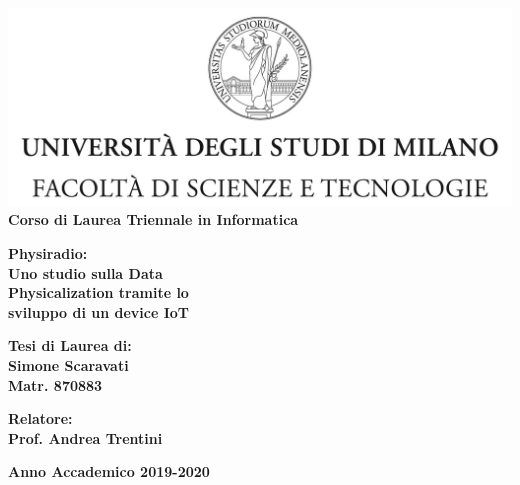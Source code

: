 \documentclass[12pt,a4paper]{report}
\begin{document}
\begin{titlepage}
\begin{center}
\includegraphics[width=\textwidth]{Immagini/Logo.jpg}\\
{\large{\bf Corso di Laurea Triennale in Informatica}}
\end{center}
\vspace{12mm}
\begin{center}
{\huge{\bf Physiradio:}}\\
\vspace{4mm}
{\huge{\bf Uno studio sulla Data}}\\
\vspace{4mm}
{\huge{\bf Physicalization tramite lo}}\\
\vspace{3mm} %
{\huge{\bf sviluppo di un device IoT}}\\

\end{center}
\vspace{14mm}
\begin{flushright}
{\large{\bf Tesi di Laurea di:}}\\
{\large{\bf Simone Scaravati}}\\
{\large{\bf Matr. 870883}}\\
\end{flushright}
\vspace{8mm}
\begin{flushleft}
{\large{\bf Relatore:}}\\
{\large{\bf Prof. Andrea Trentini}}\\

\end{flushleft}
\vspace{16mm}
\begin{center}
{\large{\bf Anno Accademico 2019-2020}}
\end{center}
\end{titlepage}

\tableofcontents
\end{document}
